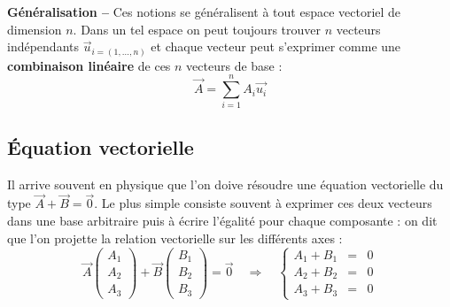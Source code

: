 \textbf{Généralisation --} Ces notions se généralisent à tout espace vectoriel de dimension $n$. Dans un tel espace on peut toujours trouver $n$ vecteurs indépendants $\overrightarrow{u}_{i=(1,\ldots,n)}$ et chaque vecteur peut s'exprimer comme une \textbf{combinaison linéaire} de ces $n$ vecteurs de base : 
\[
	\overrightarrow{A}=\sum_{i=1}^n A_i \overrightarrow{u_i}
\]
\subsection{Équation vectorielle} %
\label{sub:equation_vectorielle}
Il arrive souvent en physique que l'on doive résoudre une  équation vectorielle du type $\overrightarrow{A}+\overrightarrow{B}=\overrightarrow{0}$. Le plus simple consiste souvent à exprimer ces deux vecteurs dans une base arbitraire puis à écrire l'égalité pour chaque composante : on dit que l'on projette la relation vectorielle sur les différents axes :
\[
	\overrightarrow{A}\begin{pmatrix}A_1\\A_2\\A_3\end{pmatrix}+
	\overrightarrow{B}\begin{pmatrix}B_1\\B_2\\B_3\end{pmatrix}=\overrightarrow{0}
	\quad\Rightarrow\quad
	\left\{\begin{array}{rcl}
	A_1+B_1&=&0\\
	A_2+B_2&=&0\\
	A_3+B_3&=&0
	\end{array}\right.	
\]


